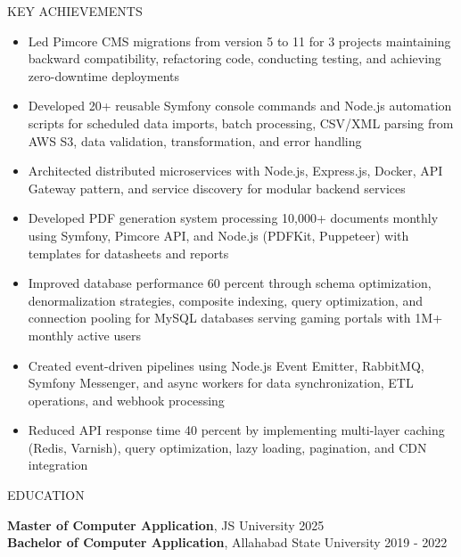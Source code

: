 \documentclass{resume} %
\begin{document}
\begin{rSection}{KEY ACHIEVEMENTS}

\begin{itemize}
    \itemsep -3pt {}
    \item Led Pimcore CMS migrations from version 5 to 11 for 3 projects maintaining backward compatibility, refactoring code, conducting testing, and achieving zero-downtime deployments
    \item Developed 20+ reusable Symfony console commands and Node.js automation scripts for scheduled data imports, batch processing, CSV/XML parsing from AWS S3, data validation, transformation, and error handling
    \item Architected distributed microservices with Node.js, Express.js, Docker, API Gateway pattern, and service discovery for modular backend services
    \item Developed PDF generation system processing 10,000+ documents monthly using Symfony, Pimcore API, and Node.js (PDFKit, Puppeteer) with templates for datasheets and reports
    \item Improved database performance 60 percent through schema optimization, denormalization strategies, composite indexing, query optimization, and connection pooling for MySQL databases serving gaming portals with 1M+ monthly active users
    \item Created event-driven pipelines using Node.js Event Emitter, RabbitMQ, Symfony Messenger, and async workers for data synchronization, ETL operations, and webhook processing
    \item Reduced API response time 40 percent by implementing multi-layer caching (Redis, Varnish), query optimization, lazy loading, pagination, and CDN integration
\end{itemize}

\end{rSection}


\begin{rSection}{EDUCATION}

{\bf Master of Computer Application}, JS University \hfill {2025}\\
{\bf Bachelor of Computer Application}, Allahabad State University \hfill {2019 - 2022}

\end{rSection}
\end{document}
